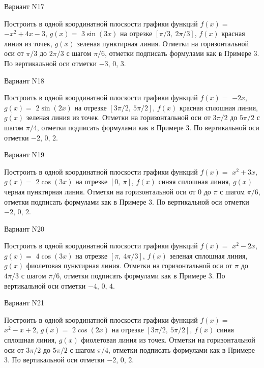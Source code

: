 \documentclass[11pt]{report}
\begin{document}
Вариант N17

Построить в одной координатной плоскости графики функций $f(x) = $
    $- x^{2} + 4 x - 3$, $g(x) = $
    $3 \sin{\left(3 x \right)}$ на 
    отрезке $\left[ \pi / 3, \  2 \pi / 3\right]$, $f(x)$ красная 
    линия из точек, $g(x)$ зеленая пунктирная линия. 
    Отметки на горизонтальной оси от $\pi / 3$ до $2 \pi / 3$ с 
    шагом $\pi / 6$, отметки подписать формулами как в Примере 3.  
    По вертикальной оси отметки $-3$, 0, $3$.

Вариант N18

Построить в одной координатной плоскости графики функций $f(x) = $
    $- 2 x$, $g(x) = $
    $2 \sin{\left(2 x \right)}$ на 
    отрезке $\left[ 3 \pi / 2, \  5 \pi / 2\right]$, $f(x)$ красная 
    сплошная линия, $g(x)$ зеленая линия из точек. 
    Отметки на горизонтальной оси от $3 \pi / 2$ до $5 \pi / 2$ с 
    шагом $\pi / 4$, отметки подписать формулами как в Примере 3.  
    По вертикальной оси отметки $-2$, 0, $2$.

Вариант N19

Построить в одной координатной плоскости графики функций $f(x) = $
    $x^{2} + 3 x$, $g(x) = $
    $2 \cos{\left(3 x \right)}$ на 
    отрезке $\left[ 0, \  \pi\right]$, $f(x)$ синяя 
    сплошная линия, $g(x)$ черная пунктирная линия. 
    Отметки на горизонтальной оси от $0$ до $\pi$ с 
    шагом $\pi / 6$, отметки подписать формулами как в Примере 3.  
    По вертикальной оси отметки $-2$, 0, $2$.

Вариант N20

Построить в одной координатной плоскости графики функций $f(x) = $
    $x^{2} - 2 x$, $g(x) = $
    $4 \cos{\left(3 x \right)}$ на 
    отрезке $\left[ \pi, \  4 \pi / 3\right]$, $f(x)$ зеленая 
    сплошная линия, $g(x)$ фиолетовая пунктирная линия. 
    Отметки на горизонтальной оси от $\pi$ до $4 \pi / 3$ с 
    шагом $\pi / 6$, отметки подписать формулами как в Примере 3.  
    По вертикальной оси отметки $-4$, 0, $4$.

Вариант N21

Построить в одной координатной плоскости графики функций $f(x) = $
    $x^{2} - x + 2$, $g(x) = $
    $2 \cos{\left(2 x \right)}$ на 
    отрезке $\left[ 3 \pi / 2, \  5 \pi / 2\right]$, $f(x)$ синяя 
    сплошная линия, $g(x)$ фиолетовая линия из точек. 
    Отметки на горизонтальной оси от $3 \pi / 2$ до $5 \pi / 2$ с 
    шагом $\pi / 4$, отметки подписать формулами как в Примере 3.  
    По вертикальной оси отметки $-2$, 0, $2$.
\end{document}
